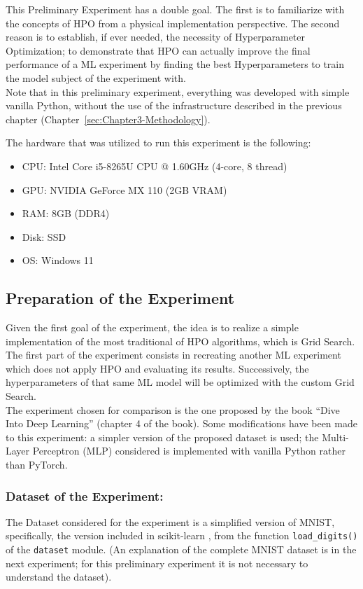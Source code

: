 This Preliminary Experiment has a double goal.
The first is to familiarize with the concepts of HPO from a physical implementation perspective.
The second reason is to establish, if ever needed, the necessity of Hyperparameter Optimization; to demonstrate that HPO can actually improve the final performance of a ML experiment by finding the best Hyperparameters to train the model subject of the experiment with.
\\[0.3cm]Note that in this preliminary experiment, everything was developed with simple vanilla Python, without the use of the infrastructure described in the previous chapter (Chapter~\ref{sec:Chapter3-Methodology}).

The hardware that was utilized to run this experiment is the following:
\begin{itemize}[itemsep=0.1cm]
    \item CPU: Intel Core i5-8265U CPU @ 1.60GHz (4-core, 8 thread)
    \item GPU: NVIDIA GeForce MX 110 (2GB VRAM)
    \item RAM: 8GB (DDR4)
    \item Disk: SSD
    \item OS: Windows 11
\end{itemize}

\subsection{Preparation of the Experiment}

Given the first goal of the experiment, the idea is to realize a simple implementation of the most traditional of HPO algorithms, which is Grid Search.
\\[0.3cm]The first part of the experiment consists in recreating another ML experiment which does not apply HPO and evaluating its results. Successively, the hyperparameters of that same ML model will be optimized with the custom Grid Search.
\\[0.3cm]The experiment chosen for comparison is the one proposed by the book “Dive Into Deep Learning” \cite{Tesi-1.6} (chapter 4 of the book). Some modifications have been made to this experiment: a simpler version of the proposed dataset is used; the Multi-Layer Perceptron (MLP) considered is implemented with vanilla Python rather than PyTorch.

\subsubsection{Dataset of the Experiment:}
The Dataset considered for the experiment is a simplified version of MNIST, specifically, the version included in scikit-learn \cite{scikit-learn}, from the function \texttt{load\_digits()} of the \texttt{dataset} module. (An explanation of the complete MNIST dataset is in the next experiment; for this preliminary experiment it is not necessary to understand the dataset).

